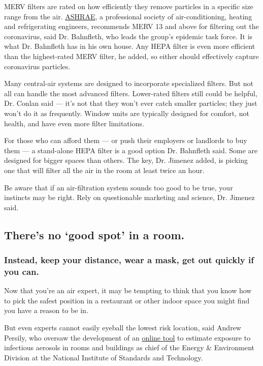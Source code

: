 MERV filters are rated on how efficiently they remove particles in a
specific size range from the air.
\href{https://www.ashrae.org/about}{ASHRAE}, a professional society of
air-conditioning, heating and refrigerating engineers, recommends MERV
13 and above for filtering out the coronavirus, said Dr. Bahnfleth, who
leads the group's epidemic task force. It is what Dr. Bahnfleth has in
his own house. Any HEPA filter is even more efficient than the
highest-rated MERV filter, he added, so either should effectively
capture coronavirus particles.

Many central-air systems are designed to incorporate specialized
filters. But not all can handle the most advanced filters. Lower-rated
filters still could be helpful, Dr. Conlan said --- it's not that they
won't ever catch smaller particles; they just won't do it as frequently.
Window units are typically designed for comfort, not health, and have
even more filter limitations.

For those who can afford them --- or push their employers or landlords
to buy them --- a stand-alone HEPA filter is a good option Dr. Bahnfleth
said. Some are designed for bigger spaces than others. The key, Dr.
Jimenez added, is picking one that will filter all the air in the room
at least twice an hour.

Be aware that if an air-filtration system sounds too good to be true,
your instincts may be right. Rely on questionable marketing and science,
Dr. Jimenez said.

\hypertarget{theres-no-good-spot-in-a-room}{%
\subsection{There's no `good spot' in a
room.}\label{theres-no-good-spot-in-a-room}}

\hypertarget{instead-keep-your-distance-wear-a-mask-get-out-quickly-if-you-can}{%
\subsubsection{Instead, keep your distance, wear a mask, get out quickly
if you
can.}\label{instead-keep-your-distance-wear-a-mask-get-out-quickly-if-you-can}}

Now that you're an air expert, it may be tempting to think that you know
how to pick the safest position in a restaurant or other indoor space
you might find you have a reason to be in.

But even experts cannot easily eyeball the lowest risk location, said
Andrew Persily, who oversaw the development of an
\href{https://www.nist.gov/services-resources/software/fatima}{online
tool} to estimate exposure to infectious aerosols in rooms and buildings
as chief of the Energy \& Environment Division at the National Institute
of Standards and Technology.


